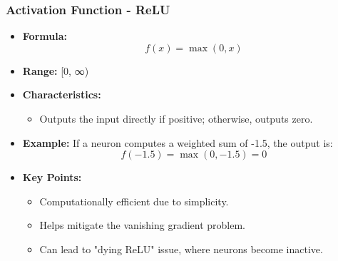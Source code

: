 \documentclass{beamer}
\begin{document}
\begin{frame}[fragile]
    \frametitle{Activation Function - ReLU}
    \begin{itemize}
        \item \textbf{Formula:}
        \begin{equation}
            f(x) = \max(0, x)
        \end{equation}
        \item \textbf{Range:} [0, ∞)
        \item \textbf{Characteristics:}
        \begin{itemize}
            \item Outputs the input directly if positive; otherwise, outputs zero.
        \end{itemize}
        \item \textbf{Example:}
        If a neuron computes a weighted sum of -1.5, the output is:
        \begin{equation}
            f(-1.5) = \max(0, -1.5) = 0
        \end{equation}
        \item \textbf{Key Points:}
        \begin{itemize}
            \item Computationally efficient due to simplicity.
            \item Helps mitigate the vanishing gradient problem.
            \item Can lead to "dying ReLU" issue, where neurons become inactive.
        \end{itemize}
    \end{itemize}
\end{frame}
\end{document}
